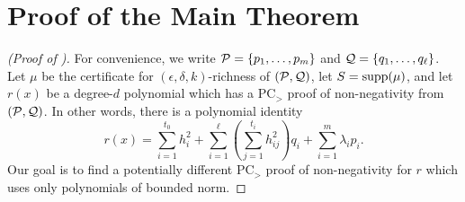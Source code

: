 \section{Proof of the Main Theorem}\label{sec:bc_proof_main}
\begin{proof}[(Proof of )]
For convenience, we write $\mathcal P = \{p_1,\dots,p_m\}$ and $\mathcal Q = \{q_1,\dots,q_\ell\}$. Let $\mu$ be the certificate for $(\epsilon,\delta,k)$-richness of $(\mathcal P,\mathcal Q)$, let $S = \operatorname{supp}(\mu)$, and let $r(x)$ be a degree-$d$ polynomial which has a PC$_>$ proof of non-negativity from $(\mathcal P,\mathcal Q)$. In other words, there is a polynomial identity
\[r(x) = \sum_{i=1}^{t_0} h_i^2 + \sum_{i=1}^\ell \left(\sum_{j=1}^{t_i} h_{ij}^2\right) q_i + \sum_{i=1}^m \lambda_i p_i.\]
Our goal is to find a potentially different PC$_>$ proof of non-negativity for $r$ which uses only polynomials of bounded norm.


\end{proof}
